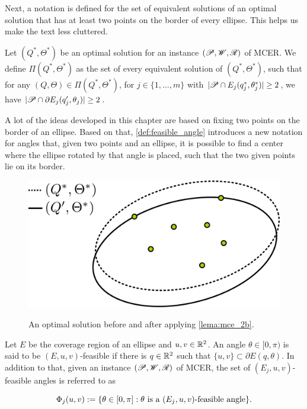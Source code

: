 Next, a notation is defined for the set of equivalent solutions of an optimal solution that has at least two points on the border of every ellipse. This helps us make the text less cluttered.

\begin{definicao}
	Let $(Q^*, \Theta^*)$ be an optimal solution for an instance $(\mathscr{P}, \mathscr{W}, \mathscr{R})$ of MCER. We define $\Pi(Q^*, \Theta^*)$ as the set of every equivalent solution of $(Q^*, \Theta^*)$, such that for any $(Q, \Theta)\in\Pi(Q^*, \Theta^*)$, for $j\in\{1, \dots, m\}$ with $|\mathscr{P} \cap E_j(q_j^*, \theta_j^*)|\ge2$, we have $|\mathscr{P} \cap \partial E_j(q_j', \theta_j)| \ge 2$.
\end{definicao}

A lot of the ideas developed in this chapter are based on fixing two points on the border of an ellipse.
Based on that, \autoref{def:feasible_angle} introduces a new notation for angles that, given two points and an ellipse, it is possible to find a center where the ellipse rotated by that angle is placed, such that the two given points lie on its border.

\begin{figure}
	\centering
	\caption{An optimal solution before and after applying \autoref{lema:mce_2b}.}
	\includegraphics[scale=.38]{tex/figures/ellipse-2-points}
	\fautor
	\label{fig:ellipse-2-points}
\end{figure}

\begin{definicao}\label{def:feasible_angle}
	Let $E$ be the coverage region of an ellipse and $u, v \in \mathbb{R}^2$. An angle $\theta \in [0, \pi)$ is said to be $(E, u, v)$-feasible if there is $q \in \mathbb{R}^2$ such that $\{u, v\} \subset \partial E(q, \theta)$.
	In addition to that, given an instance  $(\mathscr{P}, \mathscr{W}, \mathscr{R})$ of MCER, the set of $(E_j, u, v)$-feasible angles is referred to as 
	
	\begin{equation}
	\Phi_j(u, v) := \{\theta \in [0, \pi] : \theta \textnormal{ is a } (E_j,u,v)\textnormal{-feasible angle}\}.
	\end{equation}
\end{definicao}

